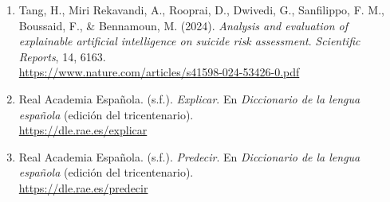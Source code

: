 \documentclass[11pt]{article}
\begin{document}
\begin{enumerate}
  \item Tang, H., Miri Rekavandi, A., Rooprai, D., Dwivedi, G., Sanfilippo, F. M., Boussaid, F., \& Bennamoun, M. (2024). \textit{Analysis and evaluation of explainable artificial intelligence on suicide risk assessment}. \textit{Scientific Reports}, 14, 6163.\\
  \url{https://www.nature.com/articles/s41598-024-53426-0.pdf}

  \item Real Academia Española. (s.f.). \textit{Explicar}. En \textit{Diccionario de la lengua española} (edición del tricentenario).\\
  \url{https://dle.rae.es/explicar}

  \item Real Academia Española. (s.f.). \textit{Predecir}. En \textit{Diccionario de la lengua española} (edición del tricentenario).\\
  \url{https://dle.rae.es/predecir}

\end{enumerate}
\end{document}
